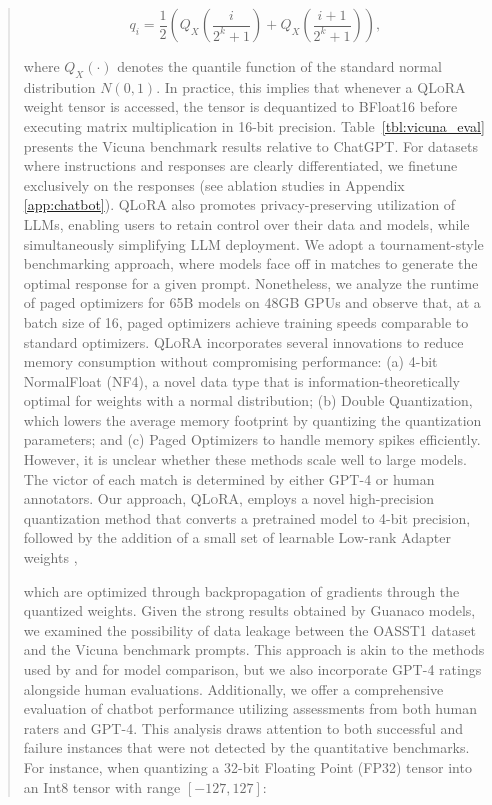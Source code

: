 \begin{quote}
{{\begin{equation}
q_i  = \frac{1}{2}\left( Q_X\left(\frac{i}{2^k+1}\right) + Q_X\left(\frac{i+1}{2^k+1}\right)\right),
\end{equation}

where $Q_X(\cdot)$ denotes the quantile function of the standard normal distribution $N(0,1)$. In practice, this implies that whenever a \textsc{QLoRA} weight tensor is accessed, the tensor is dequantized to BFloat16 before executing matrix multiplication in 16-bit precision. Table~\ref{tbl:vicuna_eval} presents the Vicuna benchmark \cite{vicuna2023} results relative to ChatGPT. For datasets where instructions and responses are clearly differentiated, we finetune exclusively on the responses (see ablation studies in Appendix \ref{app:chatbot}). \textsc{QLoRA} also promotes privacy-preserving utilization of LLMs, enabling users to retain control over their data and models, while simultaneously simplifying LLM deployment. We adopt a tournament-style benchmarking approach, where models face off in matches to generate the optimal response for a given prompt. Nonetheless, we analyze the runtime of paged optimizers for 65B models on 48GB GPUs and observe that, at a batch size of 16, paged optimizers achieve training speeds comparable to standard optimizers. \textsc{QLoRA} incorporates several innovations to reduce memory consumption without compromising performance: (a) 4-bit NormalFloat (NF4), a novel data type that is information-theoretically optimal for weights with a normal distribution; (b) Double Quantization, which lowers the average memory footprint by quantizing the quantization parameters; and (c) Paged Optimizers to handle memory spikes efficiently. However, it is unclear whether these methods scale well to large models. The victor of each match is determined by either GPT-4 or human annotators. Our approach, \textsc{QLoRA}, employs a novel high-precision quantization method that converts a pretrained model to 4-bit precision, followed by the addition of a small set of learnable Low-rank Adapter weights \citep{hu2021lora}, 

which are optimized through backpropagation of gradients through the quantized weights. Given the strong results obtained by {Guanaco} models, we examined the possibility of data leakage between the OASST1 dataset and the Vicuna benchmark prompts. This approach is akin to the methods used by \citet{bai2022training} and \citet{vicuna2023} for model comparison, but we also incorporate GPT-4 ratings alongside human evaluations. Additionally, we offer a comprehensive evaluation of chatbot performance utilizing assessments from both human raters and GPT-4. This analysis draws attention to both successful and failure instances that were not detected by the quantitative benchmarks. For instance, when quantizing a 32-bit Floating Point (FP32) tensor into an Int8 tensor with range $[-127, 127]$:

}}
\end{quote}
